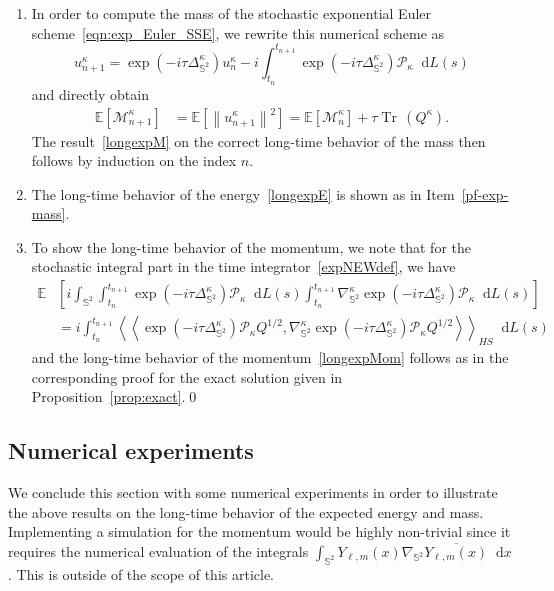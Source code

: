 \documentclass[11pt]{amsart}
\newcommand{\E}{{\mathbb E}}
\newcommand{\IS}{\mathbb{S}}
\newcommand{\tr}{{\operatorname{Tr}\, }}
\newcommand{\cM}{\mathcal M}
\providecommand{\norm}[1]{\left\lVert#1\right\rVert}
\newcommand*\dd{\mathop{}\!\mathrm{d}}
\newcommand{\expp}[1]{\exp\left(#1\right)}
\newcommand{\Deltalb}{\Delta_{\IS^2}}
\newcommand{\nablalb}{\nabla_{\IS^{2}}}
\newcommand{\cP}{\mathcal{P}}
\begin{document}
\begin{appendixproof}
    \begin{enumerate}[label=\roman*)]
    \item \label{pf-exp-mass} In order to compute the mass of the stochastic exponential Euler scheme~\eqref{eqn:exp_Euler_SSE}, we rewrite this numerical scheme as
   \begin{equation}\label{expNEWdef}
        u^\kappa_{n+1} = \expp{-i\tau\Deltalb^\kappa} u^\kappa_n - i \int_{t_n}^{t_{n+1}} \expp{-i\tau\Deltalb^\kappa}\cP_\kappa \dd L(s)
   \end{equation}
   and directly obtain
    \begin{align*}
    \E\left[\cM^\kappa_{n+1}\right]&=\E\left[\norm{u^\kappa_{n+1}}^2\right] = \E\left[\cM^\kappa_n\right] + {\tau}\tr(Q^\kappa).
    \end{align*}
    The result~\eqref{longexpM} on the correct long-time behavior of the mass then follows by induction on the index $n$.
\item The long-time behavior of the energy~\eqref{longexpE} is shown as in Item~\ref{pf-exp-mass}.
\item To show the long-time behavior of the momentum, we note that for the stochastic integral part in the time integrator~\eqref{expNEWdef},
we have
\begin{align*}
	\mathbb E &\left[i\int_{\IS^2} \int_{t_n}^{t_{n+1}}\expp{-i\tau\Deltalb^\kappa} \cP_\kappa \dd L(s)\int_{t_n}^{t_{n+1}}\nablalb^\kappa \expp{-i\tau\Deltalb^\kappa} \cP_\kappa \dd L(s)\right]\\
	&=i\int_{t_n}^{t_{n+1}}\left<\left<\expp{-i\tau\Deltalb^\kappa}\cP_\kappa Q^{1/2},\nablalb^\kappa\expp{-i\tau\Deltalb^\kappa}\cP_\kappa Q^{1/2}\right>\right>_{HS}\dd L(s)
\end{align*}
and the long-time behavior of the momentum~\eqref{longexpMom} follows as in the corresponding proof for the exact solution given in  Proposition~\ref{prop:exact}.\qed
\end{enumerate}
\renewcommand{\qedsymbol}{}
\end{appendixproof}

\subsection{Numerical experiments}\label{sch-num}
We conclude this section with some numerical experiments in order to illustrate the above results on the long-time behavior of the expected energy and mass.
Implementing a simulation for the momentum would be highly non-trivial since it requires the numerical evaluation of the integrals $\int_{\IS^2} Y_{\ell , m}(x) \nablalb \overline{Y_{\ell , m}(x)} \dd x$. This is outside of the scope of this article.
\end{document}
